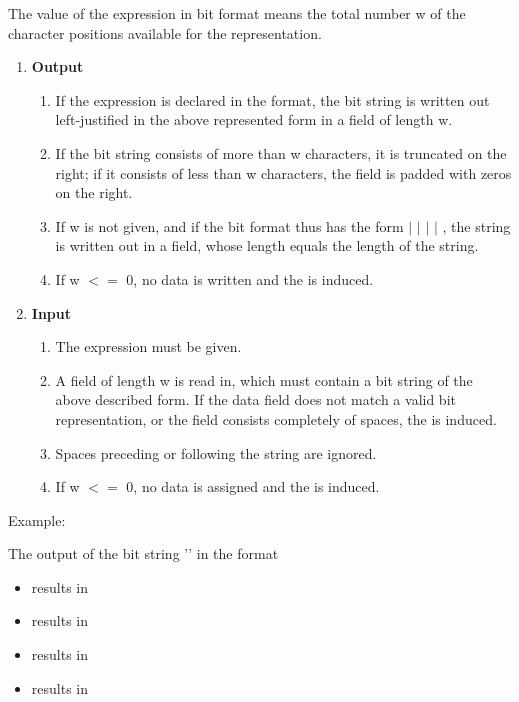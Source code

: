 The value of the expression in bit format means the total number w of
the character positions available for the representation.
\begin{enumerate}
\item {\bf Output}\\
\begin{enumerate}
\item If the expression is declared in the format, the bit string is written
out left-justified in the above represented form in a field of length
w. 
\item If the bit string consists of more than w characters, it is truncated
on the right; if it consists of less than w characters, the field is
padded with zeros on the right. 
\item If w is not given, and if the bit format
thus has the form  $\mid$  $\mid$  $\mid$
	  $\mid$ , the string
is written out in a field, whose length equals the length of the
string.
\item If w $<=$ 0, no data is written and the  is induced.
\end{enumerate}
\item {\bf Input}\\
\begin{enumerate}
\item The expression must be given.
\item A field of length w is read in, which must contain a bit string of the
above described form.
If the data field does not match a valid bit representation, 
or the field consists completely of spaces,
the
 is induced.
\item Spaces preceding or following the string are ignored.

\item If w $<=$ 0, no data is assigned and the  is induced.


\end{enumerate}
\end{enumerate}

Example:

The output of the bit string '' in the format

\begin{itemize}
\item {} results in  
\item {} results in  
\item {} results in  
\item {} results in 
\end{itemize}


